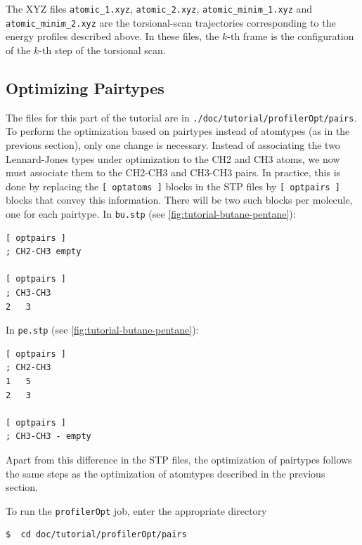 \documentclass[10pt,a4paper,openany]{memoir}
\numberwithin{equation}{section}
\newcommand{\profileropt}[0]{\texttt{profilerOpt}}
\begin{document}
The XYZ files \texttt{atomic\_1.xyz}, \texttt{atomic\_2.xyz},
\texttt{atomic\_minim\_1.xyz} and \texttt{atomic\_minim\_2.xyz} are
the torsional-scan trajectories corresponding to the energy profiles
described above. In these files, the $k$-th frame is the configuration
of the $k$-th step of the torsional scan.

\subsection{Optimizing Pairtypes}
\label{sec:tutorial-profileropt-pairs}

The files for this part of the tutorial are in
\texttt{./doc/tutorial/profilerOpt/pairs}.  To perform the
optimization based on pairtypes instead of atomtypes (as in the
previous section), only one change is necessary.  Instead of
associating the two Lennard-Jones types under optimization to the CH2
and CH3 atoms, we now must associate them to the CH2-CH3 and CH3-CH3
pairs.  In practice, this is done by replacing the
\texttt{[~optatoms~]} blocks in the STP files by \texttt{[~optpairs~]}
blocks that convey this information. There will be two such blocks per
molecule, one for each pairtype. In \texttt{bu.stp}
(see \autoref{fig:tutorial-butane-pentane}):

\begin{lstlisting}[language=gromacs]
[ optpairs ]
; CH2-CH3 empty

[ optpairs ]
; CH3-CH3
2   3
\end{lstlisting}\vspace{2ex}\par

\noindent In \texttt{pe.stp}
(see \autoref{fig:tutorial-butane-pentane}):

\begin{lstlisting}[language=gromacs]
[ optpairs ]
; CH2-CH3
1   5
2   3

[ optpairs ]
; CH3-CH3 - empty
\end{lstlisting}\vspace{2ex}\par

\noindent Apart from this difference in the STP files, the optimization of
pairtypes follows the same steps as the optimization of atomtypes
described in the previous section.
%

To run the \profileropt{} job, enter the appropriate directory

\begin{lstlisting}[language=bash]
$  cd doc/tutorial/profilerOpt/pairs
\end{lstlisting}\vspace{2ex}\par
\end{document}
